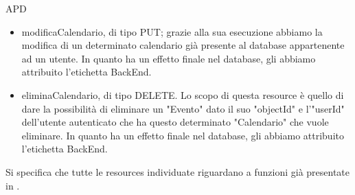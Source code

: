 \begin{listaPersonale} {APD}
\begin{listaPersonale2}[APD]{}
\begin{itemize}
\begin{itemize}
                      \item modificaCalendario, di tipo PUT; grazie alla sua esecuzione abbiamo la modifica di un determinato calendario già presente al database appartenente ad un utente. In quanto ha un effetto finale nel database, gli abbiamo attribuito l'etichetta BackEnd.
                      \item eliminaCalendario, di tipo DELETE. Lo scopo di questa resource è quello di dare la possibilità di eliminare un "Evento" dato il suo "objectId" e l'"userId" dell'utente autenticato che ha questo determinato "Calendario" che vuole eliminare. In quanto ha un effetto finale nel database, gli abbiamo attribuito l'etichetta BackEnd.
                  \end{itemize}
                  Si specifica che tutte le resources individuate riguardano a funzioni già presentate in .
        \end{itemize}

        \begin{center}
            
        \end{center}
        \newpage



\end{listaPersonale2}
\end{listaPersonale}
